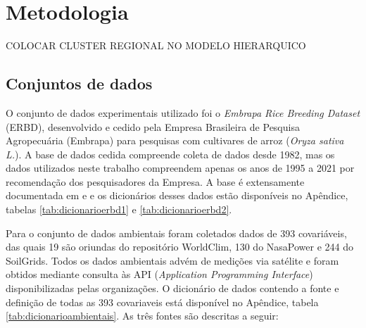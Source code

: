 \documentclass[12pt, a4paper, twoside]{report}
\numberwithin{equation}{subsection} %
\begin{document}
%
%
%




\chapter{Metodologia}


COLOCAR CLUSTER REGIONAL NO MODELO HIERARQUICO



\section{Conjuntos de dados}


O conjunto de dados experimentais utilizado foi o \textit{Embrapa Rice Breeding Dataset} (ERBD), desenvolvido e cedido pela Empresa Brasileira de Pesquisa Agropecuária (Embrapa) para pesquisas com cultivares de arroz (\textit{Oryza sativa L.}). A base de dados cedida compreende coleta de dados desde 1982, mas os dados utilizados neste trabalho compreendem apenas os anos de 1995 a 2021 por recomendação dos pesquisadores da Empresa. A base é extensamente documentada em \cite{breseghello2011} e \cite{breseghello2021} e os dicionários desses dados estão disponíveis no Apêndice, tabelas \ref{tab:dicionarioerbd1} e \ref{tab:dicionarioerbd2}.

Para o conjunto de dados ambientais foram coletados dados de 393 covariáveis, das quais 19 são oriundas do repositório WorldClim, 130 do NasaPower e 244 do SoilGrids. Todos os dados ambientais advém de medições via satélite e foram obtidos mediante consulta às API (\textit{Application Programming Interface}) disponibilizadas pelas organizações. O dicionário de dados contendo a fonte e definição de todas as 393 covariaveis está disponível no Apêndice, tabela \ref{tab:dicionarioambientais}.  As três fontes são descritas a seguir:
\end{document}
